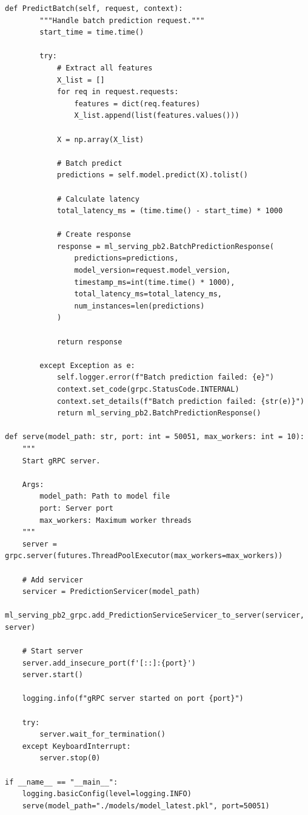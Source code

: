 \begin{lstlisting}[style=python, caption={gRPC Server Implementation}]
    def PredictBatch(self, request, context):
        """Handle batch prediction request."""
        start_time = time.time()

        try:
            # Extract all features
            X_list = []
            for req in request.requests:
                features = dict(req.features)
                X_list.append(list(features.values()))

            X = np.array(X_list)

            # Batch predict
            predictions = self.model.predict(X).tolist()

            # Calculate latency
            total_latency_ms = (time.time() - start_time) * 1000

            # Create response
            response = ml_serving_pb2.BatchPredictionResponse(
                predictions=predictions,
                model_version=request.model_version,
                timestamp_ms=int(time.time() * 1000),
                total_latency_ms=total_latency_ms,
                num_instances=len(predictions)
            )

            return response

        except Exception as e:
            self.logger.error(f"Batch prediction failed: {e}")
            context.set_code(grpc.StatusCode.INTERNAL)
            context.set_details(f"Batch prediction failed: {str(e)}")
            return ml_serving_pb2.BatchPredictionResponse()

def serve(model_path: str, port: int = 50051, max_workers: int = 10):
    """
    Start gRPC server.

    Args:
        model_path: Path to model file
        port: Server port
        max_workers: Maximum worker threads
    """
    server = grpc.server(futures.ThreadPoolExecutor(max_workers=max_workers))

    # Add servicer
    servicer = PredictionServicer(model_path)
    ml_serving_pb2_grpc.add_PredictionServiceServicer_to_server(servicer, server)

    # Start server
    server.add_insecure_port(f'[::]:{port}')
    server.start()

    logging.info(f"gRPC server started on port {port}")

    try:
        server.wait_for_termination()
    except KeyboardInterrupt:
        server.stop(0)

if __name__ == "__main__":
    logging.basicConfig(level=logging.INFO)
    serve(model_path="./models/model_latest.pkl", port=50051)
\end{lstlisting}

